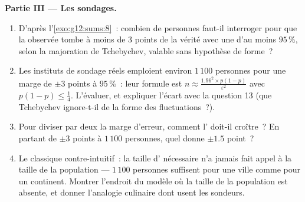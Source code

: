 \begin{problem}
\medskip
\noindent\textbf{Partie III --- Les sondages.}
\begin{enumerate}[resume]
  \item D'après l'\cref{exo:g12:sums:8}~: combien de personnes
        faut-il interroger pour que la  observée tombe à
        moins de $3$ points de la vérité avec une  d'au
        moins $95\,\%$, selon la majoration de Tchebychev, valable
        sans hypothèse de forme~?
  \item Les instituts de sondage réels emploient environ $1\,100$
        personnes pour une marge de $\pm 3$ points à $95\,\%$~:
        leur formule est
        $n \approx \frac{1.96^2 \times p(1-p)}{\varepsilon^2}$ avec
        $p(1-p) \leq \frac14$. L'évaluer, et expliquer l'écart avec
        la question 13 (que Tchebychev ignore-t-il de la forme des
        fluctuations~?).
  \item Pour diviser par deux la marge d'erreur, comment
        l' doit-il croître~? En partant de $\pm 3$ points
        à $1\,100$ personnes, quel  donne $\pm 1.5$
        point~?
  \item Le classique contre-intuitif~: la taille d'
        nécessaire n'a jamais fait appel à la taille de la
        population --- $1\,100$ personnes suffisent pour une ville
        comme pour un continent. Montrer l'endroit du modèle où la
        taille de la population est absente, et donner l'analogie
        culinaire dont usent les sondeurs.
\end{enumerate}


\end{problem}
